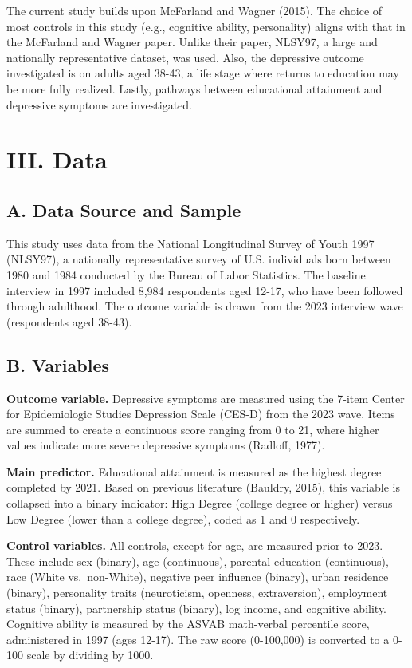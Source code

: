 \documentclass[
  12pt,
]{article}
\begin{document}
The current study builds upon McFarland and Wagner (2015). The choice of
most controls in this study (e.g., cognitive ability, personality)
aligns with that in the McFarland and Wagner paper. Unlike their paper,
NLSY97, a large and nationally representative dataset, was used. Also,
the depressive outcome investigated is on adults aged 38-43, a life
stage where returns to education may be more fully realized. Lastly,
pathways between educational attainment and depressive symptoms are
investigated.

\section{III. Data}\label{iii.-data}

\subsection{A. Data Source and Sample}\label{a.-data-source-and-sample}

This study uses data from the National Longitudinal Survey of Youth 1997
(NLSY97), a nationally representative survey of U.S. individuals born
between 1980 and 1984 conducted by the Bureau of Labor Statistics. The
baseline interview in 1997 included 8,984 respondents aged 12-17, who
have been followed through adulthood. The outcome variable is drawn from
the 2023 interview wave (respondents aged 38-43).

\subsection{B. Variables}\label{b.-variables}

\textbf{Outcome variable.} Depressive symptoms are measured using the
7-item Center for Epidemiologic Studies Depression Scale (CES-D) from
the 2023 wave. Items are summed to create a continuous score ranging
from 0 to 21, where higher values indicate more severe depressive
symptoms (Radloff, 1977).

\textbf{Main predictor.} Educational attainment is measured as the
highest degree completed by 2021. Based on previous literature (Bauldry,
2015), this variable is collapsed into a binary indicator: High Degree
(college degree or higher) versus Low Degree (lower than a college
degree), coded as 1 and 0 respectively.

\textbf{Control variables.} All controls, except for age, are measured
prior to 2023. These include sex (binary), age (continuous), parental
education (continuous), race (White vs.~non-White), negative peer
influence (binary), urban residence (binary), personality traits
(neuroticism, openness, extraversion), employment status (binary),
partnership status (binary), log income, and cognitive ability.
Cognitive ability is measured by the ASVAB math-verbal percentile score,
administered in 1997 (ages 12-17). The raw score (0-100,000) is
converted to a 0-100 scale by dividing by 1000.
\end{document}
